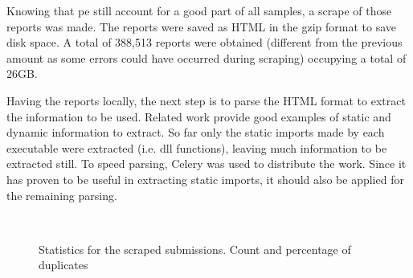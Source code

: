 \documentclass{llncs}
\begin{document}
Knowing that \gls{pe} still account for a good part of all samples, a scrape of those reports was made. The reports were saved as HTML in the gzip format to save disk space. A total of 388,513 reports were obtained (different from the previous amount as some errors could have occurred during scraping) occupying a total of 26GB.

Having the reports locally, the next step is to parse the HTML format to extract the information to be used. Related work\cite{miller:rev_int,nissim:al_pdf,rieck:dynamic,schultz:data_mining,shabtai:survey} provide good examples of static and dynamic information to extract. So far only the static imports made by each executable were extracted (i.e. \gls{dll} functions), leaving much information to be extracted still. To speed parsing, Celery\cite{tool:celery} was used to distribute the work. Since it has proven to be useful in extracting static imports, it should also be applied for the remaining parsing.

\begin{figure}[!h]
	\\
	\caption{Statistics for the scraped submissions. Count and percentage of duplicates}
	\label{fig:dist_submissions}
\end{figure}
\end{document}
